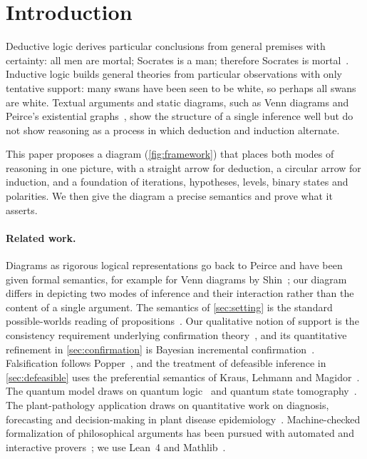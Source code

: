 \section{Introduction}\label{sec:intro}

Deductive logic derives particular conclusions from general premises with certainty: all men are
mortal; Socrates is a man; therefore Socrates is mortal~\cite{aristotle}. Inductive logic builds
general theories from particular observations with only tentative support: many swans have been
seen to be white, so perhaps all swans are white. Textual arguments and static diagrams, such as
Venn diagrams and Peirce's existential graphs~\cite{peirce}, show the structure of a single
inference well but do not show reasoning as a process in which deduction and induction alternate.

This paper proposes a diagram (\cref{fig:framework}) that places both modes of reasoning in one
picture, with a straight arrow for deduction, a circular arrow for induction, and a foundation of
iterations, hypotheses, levels, binary states and polarities. We then give the diagram a precise
semantics and prove what it asserts.

\paragraph{Related work.} Diagrams as rigorous logical representations go back to Peirce and
have been given formal semantics, for example for Venn diagrams by Shin~\cite{shin}; our diagram
differs in depicting two modes of inference and their interaction rather than the content of a
single argument. The semantics of \cref{sec:setting} is the standard possible-worlds
reading of propositions~\cite{kripke}. Our qualitative notion of support is the consistency
requirement underlying confirmation theory~\cite{hempel}, and its quantitative refinement in
\cref{sec:confirmation} is Bayesian incremental confirmation~\cite{carnap,earman,fitelson}.
Falsification follows Popper~\cite{popper}, and the treatment of defeasible inference in
\cref{sec:defeasible} uses the preferential semantics of Kraus, Lehmann and
Magidor~\cite{klm,makinson}. The quantum model draws on quantum logic~\cite{birkhoff,dallachiara}
and quantum state tomography~\cite{hradil,nielsen}. The plant-pathology application draws on
quantitative work on diagnosis, forecasting and decision-making in plant disease
epidemiology~\cite{hughes1999,madden2007,willbur2018}. Machine-checked formalization of philosophical
arguments has been pursued with automated and interactive provers~\cite{fitelsonzalta,benzmuller};
we use Lean~4 and Mathlib~\cite{lean4,mathlib}.

